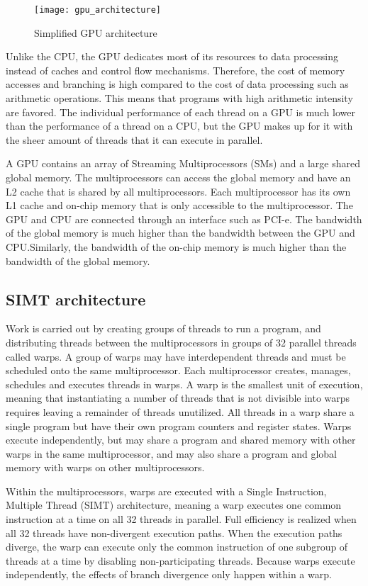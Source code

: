 \begin{figure}[h]
    \centering
    \texttt{[image: gpu\_architecture]}
    \caption{Simplified GPU architecture}
    \label{fig:gpu_architecture}
\end{figure}

Unlike the CPU, the GPU dedicates most of its resources to data processing instead of caches and control flow mechanisms. Therefore, the cost of memory accesses and branching is high compared to the cost of data processing such as arithmetic operations. This means that programs with high arithmetic intensity are favored. The individual performance of each thread on a GPU is much lower than the performance of a thread on a CPU, but the GPU makes up for it with the sheer amount of threads that it can execute in parallel.

A GPU contains an array of Streaming Multiprocessors (SMs) and a large shared global memory. The multiprocessors can access the global memory and have an L2 cache that is shared by all multiprocessors. Each multiprocessor has its own L1 cache and on-chip memory that is only accessible to the multiprocessor. The GPU and CPU are connected through an interface such as PCI-e. The bandwidth of the global memory is much higher than the bandwidth between the GPU and CPU.\@ Similarly, the bandwidth of the on-chip memory is much higher than the bandwidth of the global memory.

\subsection{SIMT architecture}

Work is carried out by creating groups of threads to run a program, and distributing threads between the multiprocessors in groups of 32 parallel threads called warps. A group of warps may have interdependent threads and must be scheduled onto the same multiprocessor. Each multiprocessor creates, manages, schedules and executes threads in warps. A warp is the smallest unit of execution, meaning that instantiating a number of threads that is not divisible into warps requires leaving a remainder of threads unutilized. All threads in a warp share a single program but have their own program counters and register states. Warps execute independently, but may share a program and shared memory with other warps in the same multiprocessor, and may also share a program and global memory with warps on other multiprocessors.

Within the multiprocessors, warps are executed with a Single Instruction, Multiple Thread (SIMT) architecture, meaning a warp executes one common instruction at a time on all 32 threads in parallel. Full efficiency is realized when all 32 threads have non-divergent execution paths. When the execution paths diverge, the warp can execute only the common instruction of one subgroup of threads at a time by disabling non-participating threads. Because warps execute independently, the effects of branch divergence only happen within a warp.

